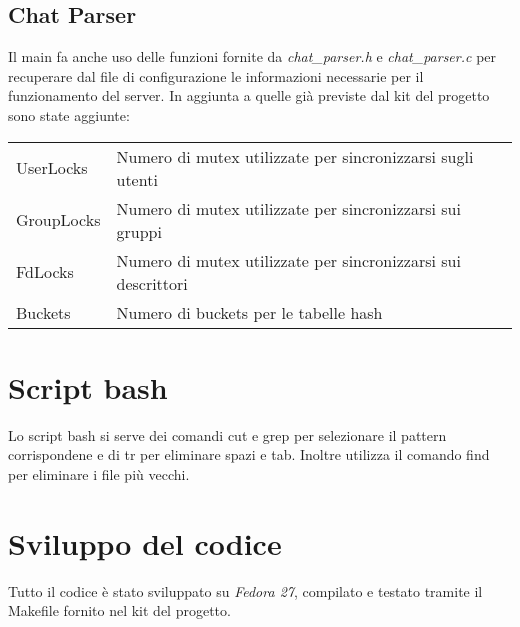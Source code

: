 \documentclass[11pt]{article}
\begin{document}
\subsection{Chat Parser}
Il main fa anche uso delle funzioni fornite da \emph{chat\_parser.h} e \emph{chat\_parser.c} per recuperare dal file di configurazione le informazioni necessarie per il funzionamento del server. In aggiunta a quelle già previste dal kit del progetto sono state aggiunte:
\begin{tabular}{ll}
	UserLocks & Numero di mutex utilizzate per sincronizzarsi sugli utenti\\
	GroupLocks & Numero di mutex utilizzate per sincronizzarsi sui gruppi\\
	FdLocks & Numero di mutex utilizzate per sincronizzarsi sui descrittori\\
	Buckets & Numero di buckets per le tabelle hash\\
\end{tabular}


\section{Script bash}
Lo script bash si serve dei comandi cut e grep per selezionare il pattern corrispondene e di tr per eliminare spazi e tab. Inoltre utilizza il comando find per eliminare i file più vecchi.
\section{Sviluppo del codice}
Tutto il codice è stato sviluppato su \emph{Fedora 27}, compilato e testato tramite il Makefile fornito nel kit del progetto.
\end{document}
